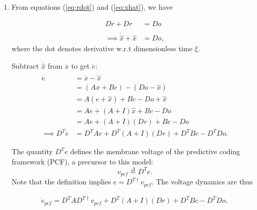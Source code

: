 \begin{enumerate}
    \item From equations (\ref{eq:rdot}) and (\ref{eq:xhat}), we have
    
    \begin{align*}
        D \dot{r} + D r &= Do \\
        \\
        \implies \dot{\hat{x}} + \hat{x} &= Do,
    \end{align*}
    where the dot denotes derivative w.r.t dimensionless time $\xi$.

    Subtract $\dot{\hat{x}}$ from $\dot{x}$ to get $\dot{e}$:
	\begin{align*}
        \dot{e} &= \dot{x}-\dot{\hat{x}} \\
        &= \left( Ax + Bc \right) - \left( Do - \hat{x} \right) \\
        &= A\left(  e + \hat{x} \right) + Bc - Do + \hat{x} \\
        &= A e + (A + I)\hat{x} + Bc - Do \\
        &=  A e + (A + I) \left(Dr\right) + Bc - Do  \\
        \implies D^T \dot{e} &= D^T A e + D^T (A + I) \left(Dr\right) + D^T Bc - D^T Do. 
	\end{align*} 
	
The quantity $D^T e$ defines the membrane voltage of the predictive coding framework (PCF), a precursor to this model:
$$
	v_{pcf} \overset{\Delta}{=}  D^T e.
$$
Note that the definition implies $e = D^{T \dagger} v_{pcf}$. 
The voltage dynamics are thus

\begin{align}
\label{eq:derivation_init}
\dot{v}_{pcf} 
= 
D^T A D^{T \dagger} v_{pcf} + D^T (A + I) \left(Dr\right) + D^T Bc - D^T Do,
\end{align}


\end{enumerate}
